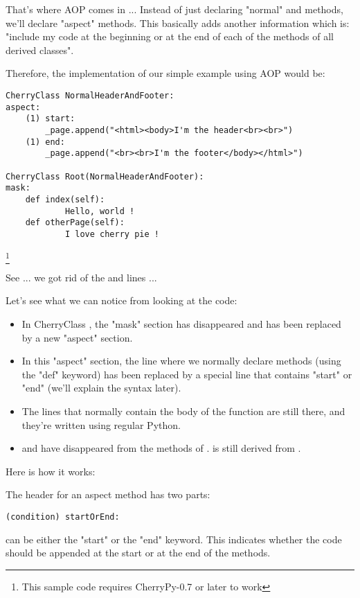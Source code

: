 \documentclass{manual}
\begin{document}
That's where AOP comes in ... Instead of just declaring "normal"  and  methods, we'll declare
"aspect" methods. This basically adds another information which is: "include my code at the beginning or at the end
of each of the methods of all derived classes".

Therefore, the implementation of our simple example using AOP would be:

\begin{verbatim}
CherryClass NormalHeaderAndFooter:
aspect:
    (1) start:
        _page.append("<html><body>I'm the header<br><br>")
    (1) end:
        _page.append("<br><br>I'm the footer</body></html>")

CherryClass Root(NormalHeaderAndFooter):
mask:
    def index(self):
            Hello, world !
    def otherPage(self):
            I love cherry pie !
\end{verbatim}
\footnote{This sample code requires CherryPy-0.7 or later to work}

See ... we got rid of the  and  lines ...

Let's see what we can notice from looking at the code:
\begin{itemize}
\item
In CherryClass , the "mask" section has disappeared and has been replaced by a new "aspect" section.
\item
In this "aspect" section, the line where we normally declare methods (using the "def" keyword) has been replaced by a special
line that contains "start" or "end" (we'll explain the syntax later).
\item
The lines that normally contain the body of the function are still there, and they're written using regular Python.
\item
{} and  have disappeared from the methods of .
 is still derived from .
\end{itemize}

Here is how it works:

The header for an aspect method has two parts:
\begin{verbatim}
(condition) startOrEnd:
\end{verbatim}
 can be either the "start" or the "end" keyword. This indicates whether the code should be appended at
the start or at the end of the methods.
\end{document}
